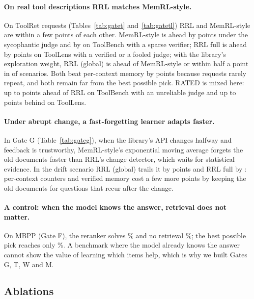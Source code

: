 \documentclass[11pt]{article}
\begin{document}
\paragraph{On real tool descriptions RRL matches MemRL-style.} On ToolRet requests
(Tables~\ref{tab:gatet} and~\ref{tab:gatetl}) RRL and MemRL-style are within a few points of each
other. MemRL-style is ahead by \TsycoMemrlLead{} points under the sycophantic judge and by
\TBsparseMemrlLead{} on ToolBench with a sparse verifier; RRL full is ahead by \TLrrlLead{} points on
ToolLens with a verified or a fooled judge; with the library's exploration weight, RRL (global) is
ahead of MemRL-style or within half a point in \TeTenWins{} of \TcellsN{} scenarios. Both beat
per-context memory by \TqmRange{} points because requests rarely repeat, and both remain far from
the best possible pick. RATED is mixed here: up to \TRatedAhead{} points ahead of RRL on ToolBench
with an unreliable judge and up to \TRatedBehind{} points behind on ToolLens.




\paragraph{Under abrupt change, a fast-forgetting learner adapts faster.} In Gate G
(Table~\ref{tab:gateg}), when the library's API changes halfway and feedback is trustworthy,
MemRL-style's exponential moving average forgets the old documents faster than RRL's change
detector, which waits for statistical evidence. In the drift scenario RRL (global) trails it by
\GdriftGlobalLag{} points and RRL full by \GdriftMemRLLead{}: per-context counters and verified
memory cost a few more points by keeping the old documents for questions that recur after the
change.



\paragraph{A control: when the model knows the answer, retrieval does not matter.} On MBPP
(Gate F), the reranker solves \Fstatic\% and no retrieval \FnoRet\%; the best possible pick reaches
only \Foracle\%. A benchmark where the model already knows the answer cannot show the value of
learning which items help, which is why we built Gates G, T, W and M.

\subsection{Ablations}
\label{sec:ablation}
\end{document}
